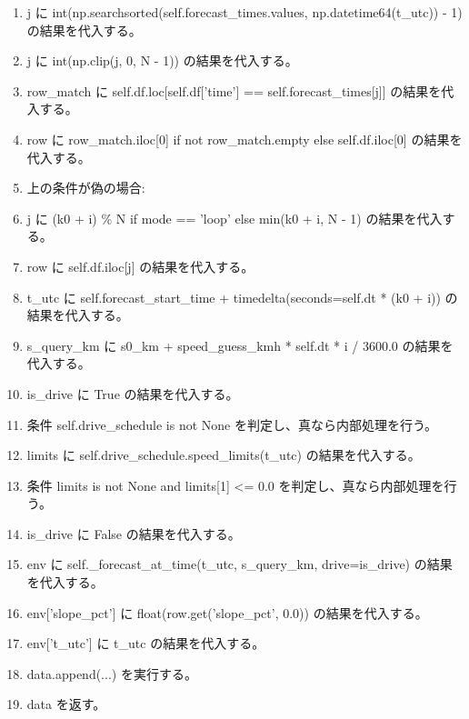 \documentclass[a4paper,11pt]{article}
\begin{document}
\begin{enumerate}[leftmargin=1.8em]
\item     j に int(np.searchsorted(self.forecast\_times.values, np.datetime64(t\_utc)) - 1) の結果を代入する。
\item     j に int(np.clip(j, 0, N - 1)) の結果を代入する。
\item     row\_match に self.df.loc[self.df['time'] == self.forecast\_times[j]] の結果を代入する。
\item     row に row\_match.iloc[0] if not row\_match.empty else self.df.iloc[0] の結果を代入する。
\item     上の条件が偽の場合:
\item     j に (k0 + i) \% N if mode == 'loop' else min(k0 + i, N - 1) の結果を代入する。
\item     row に self.df.iloc[j] の結果を代入する。
\item     t\_utc に self.forecast\_start\_time + timedelta(seconds=self.dt * (k0 + i)) の結果を代入する。
\item   s\_query\_km に s0\_km + speed\_guess\_kmh * self.dt * i / 3600.0 の結果を代入する。
\item   is\_drive に True の結果を代入する。
\item   条件 self.drive\_schedule is not None を判定し、真なら内部処理を行う。
\item     limits に self.drive\_schedule.speed\_limits(t\_utc) の結果を代入する。
\item     条件 limits is not None and limits[1] <= 0.0 を判定し、真なら内部処理を行う。
\item       is\_drive に False の結果を代入する。
\item   env に self.\_forecast\_at\_time(t\_utc, s\_query\_km, drive=is\_drive) の結果を代入する。
\item   env['slope\_pct'] に float(row.get('slope\_pct', 0.0)) の結果を代入する。
\item   env['t\_utc'] に t\_utc の結果を代入する。
\item   data.append(...) を実行する。
\item data を返す。
            \end{enumerate}
\end{document}
